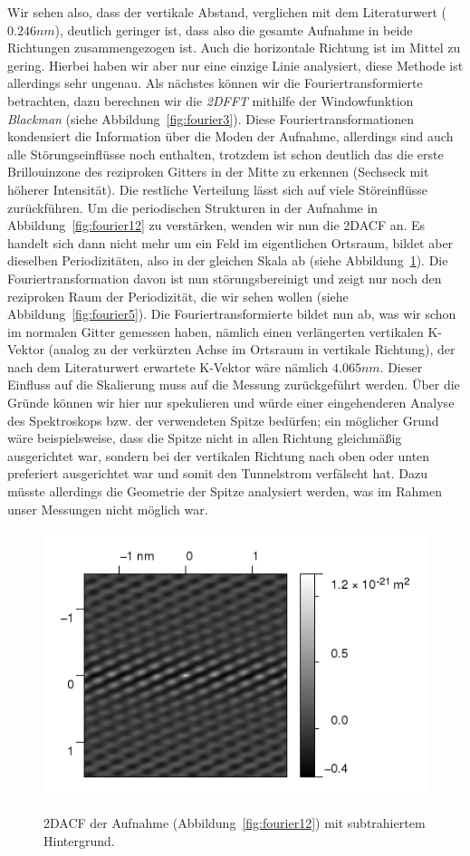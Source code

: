 Wir sehen also, dass der vertikale Abstand, verglichen mit dem Literaturwert ($0.246nm$), deutlich
geringer ist, dass also die gesamte Aufnahme in beide Richtungen zusammengezogen ist. 
Auch die horizontale Richtung ist im Mittel zu gering. Hierbei haben wir aber nur eine einzige
Linie analysiert, diese Methode ist allerdings sehr ungenau. 
Als nächstes können wir die Fouriertransformierte betrachten, dazu
berechnen wir die \textit{2DFFT} mithilfe der Windowfunktion \textit{Blackman} 
(siehe Abbildung~\ref{fig:fourier3}). Diese Fouriertransformationen kondensiert die Information
über die Moden der Aufnahme, allerdings sind auch alle Störungseinflüsse noch enthalten, trotzdem
ist schon deutlich das die erste Brillouinzone des reziproken Gitters in der Mitte zu erkennen
(Sechseck mit höherer Intensität). Die restliche Verteilung lässt sich auf viele Störeinflüsse
zurückführen. Um die periodischen Strukturen in der Aufnahme in Abbildung~\ref{fig:fourier12} zu
verstärken, wenden wir nun die 2DACF an. Es handelt sich dann nicht mehr um ein Feld im 
eigentlichen Ortsraum, bildet aber dieselben Periodizitäten, also in der gleichen Skala ab
(siehe Abbildung~\ref{fig:fourier4}). Die Fouriertransformation davon ist nun störungsbereinigt
und zeigt nur noch den reziproken Raum der Periodizität, die wir sehen wollen
(siehe Abbildung~\ref{fig:fourier5}). Die Fouriertransformierte bildet nun ab, was wir schon
im normalen Gitter gemessen haben, nämlich einen verlängerten vertikalen K-Vektor (analog
zu der verkürzten Achse im Ortsraum in vertikale Richtung), der nach dem Literaturwert 
erwartete K-Vektor wäre nämlich $4.065nm$. Dieser Einfluss auf die Skalierung
muss auf die Messung zurückgeführt werden. Über die Gründe können wir hier nur spekulieren und 
würde einer eingehenderen Analyse des Spektroskops bzw. der verwendeten Spitze bedürfen; 
ein möglicher Grund wäre beispielsweise, dass die Spitze nicht in allen Richtung gleichmäßig 
ausgerichtet war, sondern bei der vertikalen Richtung nach oben oder unten preferiert ausgerichtet
war und somit den Tunnelstrom verfälscht hat. Dazu müsste allerdings die Geometrie der Spitze 
analysiert werden, was im Rahmen unser Messungen nicht möglich war.
\begin{figure}
    \caption{2DACF der Aufnahme (Abbildung~\ref{fig:fourier12}) mit
    subtrahiertem Hintergrund. }
    \includegraphics[width=0.7 \textwidth]{pics/fourier4}
    \label{fig:fourier4}
\end{figure}
